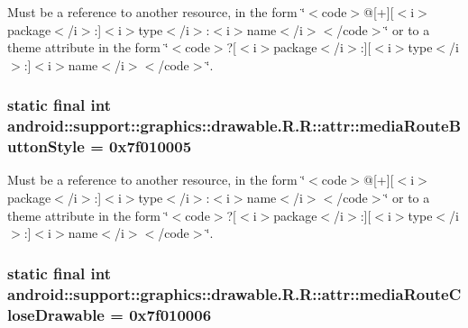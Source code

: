 Must be a reference to another resource, in the form \char`\"{}$<$code$>$@\mbox{[}+\mbox{]}\mbox{[}$<$i$>$package$<$/i$>$:\mbox{]}$<$i$>$type$<$/i$>$:$<$i$>$name$<$/i$>$$<$/code$>$\char`\"{} or to a theme attribute in the form \char`\"{}$<$code$>$?\mbox{[}$<$i$>$package$<$/i$>$:\mbox{]}\mbox{[}$<$i$>$type$<$/i$>$:\mbox{]}$<$i$>$name$<$/i$>$$<$/code$>$\char`\"{}. \hypertarget{classandroid_1_1support_1_1graphics_1_1drawable_1_1_r_1_1attr_5db18602177d323d2a2796a4e62df662}{
\subsubsection[{mediaRouteButtonStyle}]{\setlength{\rightskip}{0pt plus 5cm}static final int android::support::graphics::drawable.R.R::attr::mediaRouteButtonStyle = 0x7f010005}}
\label{classandroid_1_1support_1_1graphics_1_1drawable_1_1_r_1_1attr_5db18602177d323d2a2796a4e62df662}


Must be a reference to another resource, in the form \char`\"{}$<$code$>$@\mbox{[}+\mbox{]}\mbox{[}$<$i$>$package$<$/i$>$:\mbox{]}$<$i$>$type$<$/i$>$:$<$i$>$name$<$/i$>$$<$/code$>$\char`\"{} or to a theme attribute in the form \char`\"{}$<$code$>$?\mbox{[}$<$i$>$package$<$/i$>$:\mbox{]}\mbox{[}$<$i$>$type$<$/i$>$:\mbox{]}$<$i$>$name$<$/i$>$$<$/code$>$\char`\"{}. \hypertarget{classandroid_1_1support_1_1graphics_1_1drawable_1_1_r_1_1attr_a2eb5c6cccbe5492049e0d1474cb0c6c}{
\subsubsection[{mediaRouteCloseDrawable}]{\setlength{\rightskip}{0pt plus 5cm}static final int android::support::graphics::drawable.R.R::attr::mediaRouteCloseDrawable = 0x7f010006}}
\label{classandroid_1_1support_1_1graphics_1_1drawable_1_1_r_1_1attr_a2eb5c6cccbe5492049e0d1474cb0c6c}


